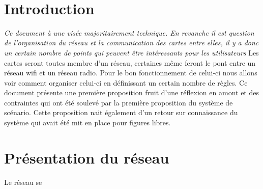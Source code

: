 \newpage
~ \thispagestyle{empty}

\tableofcontents

\newpage

\setcounter{page}{1}

\section{Introduction}
\textit{Ce document à une visée majoritairement technique. En revanche il est question de l'organisation du réseau et la communication des cartes entre elles, il y a donc un certain nombre de points qui peuvent être intéressants pour les utilisateurs}\p
Les cartes seront toutes membre d'un réseau, certaines même feront le pont entre un réseau wifi et un réseau radio. Pour le bon fonctionnement de celui-ci nous allons voir comment organiser celui-ci en définissant un certain nombre de règles.\p
Ce document présente une première proposition fruit d'une réflexion en amont et des contraintes qui ont été soulevé par la première proposition du système de scénario. Cette proposition nait également d'un retour sur connaissance du système qui avait été mit en place pour figures libres.

\section{Présentation du réseau}
Le réseau se



   
   



